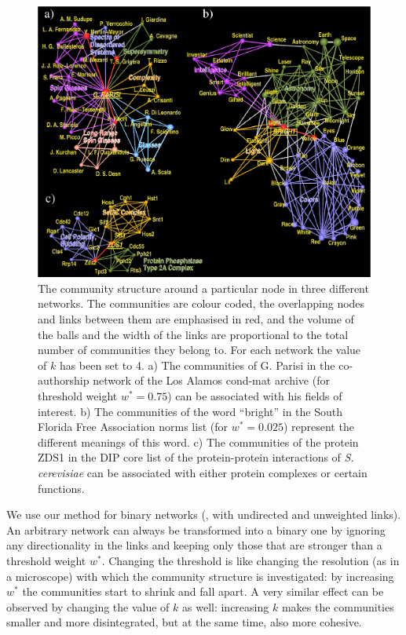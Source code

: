 \documentclass[11pt,a4paper]{article}
\begin{document}
\begin{figure}[!t]
\centerline{\includegraphics[width=\textwidth]{vegso/glay_feliratos_alt}}
\caption{
The community structure around a particular node in three
different networks.
The communities are colour coded, the overlapping
nodes and links between them are emphasised in red, and the volume of
the balls and the width of the links are proportional to the total
number of communities they belong to. For each network the value of $k$
has been set to 4.
%
a) The communities of G. Parisi in the co-authorship network
of the Los Alamos cond-mat archive (for threshold weight $w^*=0.75$)
can be associated with his fields of interest.
%
b) The communities of the word ``bright'' in the South Florida Free
Association norms list (for $w^*=0.025$) represent the different
meanings of this word.
%
c) The communities of the protein ZDS1 in the DIP core list of the
protein-protein interactions of \textit{S. cerevisiae} can be
associated with either protein complexes or certain functions.
}
\label{fig:glay}
\end{figure}

We use our method for binary networks (\ie, with undirected
and unweighted links). An arbitrary network can always be
transformed into a binary one by
ignoring any directionality in the links and
keeping only those that are stronger than
a threshold weight $w^*$.
Changing the threshold is like changing the resolution (as in a
microscope) with which the community structure is investigated: by
increasing $w^*$ the communities start to shrink and fall apart. A very
similar effect can be observed by changing the value of $k$ as well:
increasing $k$ makes the communities smaller and more disintegrated, but
at the same time, also more cohesive.
\end{document}
